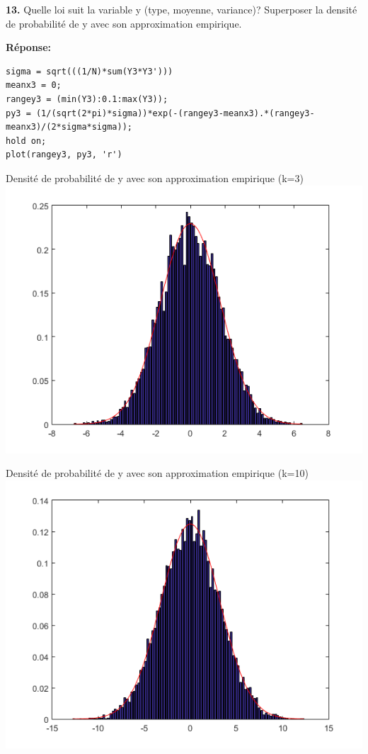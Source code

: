 \documentclass[12pt]{article}
\begin{document}
\smallbreak

\textbf{13.} Quelle loi suit la variable y (type, moyenne, variance)? Superposer la densité de probabilité de y avec son approximation empirique.

\smallbreak
\textbf{Réponse:}

\begin{lstlisting}[style=Matlab-editor]
sigma = sqrt(((1/N)*sum(Y3*Y3')))
meanx3 = 0;
rangey3 = (min(Y3):0.1:max(Y3));
py3 = (1/(sqrt(2*pi)*sigma))*exp(-(rangey3-meanx3).*(rangey3-meanx3)/(2*sigma*sigma));
hold on;
plot(rangey3, py3, 'r')
\end{lstlisting}

\begin{flushleft}
Densité de probabilité de y avec son approximation empirique (k=3)
\includegraphics{3_13.PNG}
\end{flushleft}

\begin{flushleft}
Densité de probabilité de y avec son approximation empirique (k=10)
\includegraphics{3_13_10.PNG}
\end{flushleft}
\end{document}
